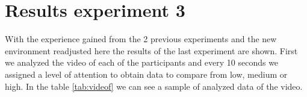 \section{Results experiment 3}
With the experience gained from the 2 previous experiments and the new environment readjusted here the results of the last experiment are shown. First we analyzed the video of each of the participants and every 10 seconds we assigned a level of attention to obtain data to compare from low, medium or high. In the table \ref{tab:videof} we can see a sample of analyzed data of the video.
